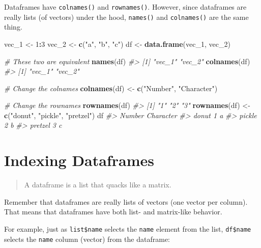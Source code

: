\documentclass[]{book}
\newenvironment{Shaded}{\begin{snugshade}}{\end{snugshade}}
\newcommand{\KeywordTok}[1]{\textcolor[rgb]{0.13,0.29,0.53}{\textbf{#1}}}
\newcommand{\DecValTok}[1]{\textcolor[rgb]{0.00,0.00,0.81}{#1}}
\newcommand{\StringTok}[1]{\textcolor[rgb]{0.31,0.60,0.02}{#1}}
\newcommand{\CommentTok}[1]{\textcolor[rgb]{0.56,0.35,0.01}{\textit{#1}}}
\newcommand{\OperatorTok}[1]{\textcolor[rgb]{0.81,0.36,0.00}{\textbf{#1}}}
\newcommand{\NormalTok}[1]{#1}
\begin{document}
Dataframes have \texttt{colnames()} and \texttt{rownames()}. However,
since dataframes are really lists (of vectors) under the hood,
\texttt{names()} and \texttt{colnames()} are the same thing.

\begin{Shaded}
\begin{Highlighting}[]
\NormalTok{vec_}\DecValTok{1}\NormalTok{ <-}\StringTok{ }\DecValTok{1}\OperatorTok{:}\DecValTok{3}
\NormalTok{vec_}\DecValTok{2}\NormalTok{ <-}\StringTok{ }\KeywordTok{c}\NormalTok{(}\StringTok{"a"}\NormalTok{, }\StringTok{"b"}\NormalTok{, }\StringTok{"c"}\NormalTok{)}
\NormalTok{df <-}\StringTok{ }\KeywordTok{data.frame}\NormalTok{(vec_}\DecValTok{1}\NormalTok{, vec_}\DecValTok{2}\NormalTok{)}

\CommentTok{# These two are equivalent}
\KeywordTok{names}\NormalTok{(df)}
\CommentTok{#> [1] "vec_1" "vec_2"}
\KeywordTok{colnames}\NormalTok{(df)}
\CommentTok{#> [1] "vec_1" "vec_2"}

\CommentTok{# Change the colnames}
\KeywordTok{colnames}\NormalTok{(df) <-}\StringTok{ }\KeywordTok{c}\NormalTok{(}\StringTok{"Number"}\NormalTok{, }\StringTok{"Character"}\NormalTok{)}

\CommentTok{# Change the rownames}
\KeywordTok{rownames}\NormalTok{(df) }
\CommentTok{#> [1] "1" "2" "3"}
\KeywordTok{rownames}\NormalTok{(df) <-}\StringTok{ }\KeywordTok{c}\NormalTok{(}\StringTok{"donut"}\NormalTok{, }\StringTok{"pickle"}\NormalTok{, }\StringTok{"pretzel"}\NormalTok{)}
\NormalTok{df}
\CommentTok{#>         Number Character}
\CommentTok{#> donut        1         a}
\CommentTok{#> pickle       2         b}
\CommentTok{#> pretzel      3         c}
\end{Highlighting}
\end{Shaded}

\section{Indexing Dataframes}\label{indexing-dataframes}

\begin{quote}
A dataframe is a list that quacks like a matrix.
\end{quote}

Remember that dataframes are really lists of vectors (one vector per
column). That means that dataframes have both list- and matrix-like
behavior.

For example, just as \texttt{list\$name} selects the \texttt{name}
element from the list, \texttt{df\$name} selects the \texttt{name}
column (vector) from the dataframe:
\end{document}
